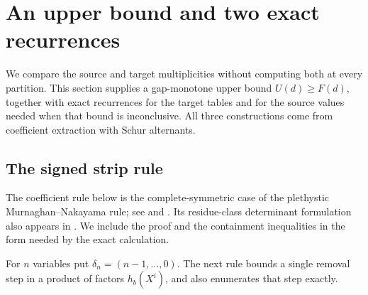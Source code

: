 \section{An upper bound and two exact recurrences}\label{sec:upper}

We compare the source and target multiplicities without computing both
at every partition. This section supplies a gap-monotone upper bound
\(U(d)\ge F(d)\), together with exact recurrences for the target tables
and for the source values needed when that bound is inconclusive.
All three constructions come from coefficient extraction with Schur
alternants.

\subsection{The signed strip rule}
The coefficient rule below is the complete-symmetric case of the
plethystic Murnaghan--Nakayama rule; see
\cite[pp.~28--29]{DesarmenienLeclercThibon1994} and
\cite[arXiv:1408.3554v2, equation~(2)]{Wildon2016}.
Its residue-class determinant formulation also appears in
\cite[Theorem~3.4 and Corollary~3.11]{CaoJingLiu2025}.
We include the proof and the containment inequalities in the form
needed by the exact calculation.

For \(n\) variables put \(\delta_n=(n-1,\ldots,0)\).
The next rule bounds a single removal step in a product of factors
\(h_b(X^i)\), and also enumerates that step exactly.

